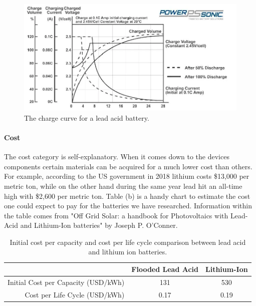 \begin{figure}
    \centering
    \includegraphics[scale=0.5]{figures/lead acid charge curve.png}
    \caption{The charge curve for a lead acid battery.}
    \label{fig:lead-acid-charge-curve} 
\end{figure}
\paragraph{Cost}
The cost category is self-explanatory. When it comes down to the devices components certain materials can be acquired for a much lower cost than others. For example, according to the US government in 2018 lithium costs \$13,000 per metric ton, while on the other hand during the same year lead hit an all-time high with \$2,600 per metric ton. Table (b) is a handy chart to estimate the cost one could expect to pay for the batteries we have researched. Information within the table comes from "Off Grid Solar: a handbook for Photovoltaics with Lead-Acid and Lithium-Ion batteries" by Joseph P. O'Conner.

\begin{table}
\centering\scriptsize
\caption{Initial cost per capacity and cost per life cycle comparison between lead acid and lithium ion batteries.}
\begin{tabular}{|r|c|c|}
\hline
& Flooded Lead Acid & Lithium-Ion \\ 
\hline
Initial Cost per Capacity (USD/kWh)    & 131   & 530  \\\hline
Cost per Life Cycle (USD/kWh)    & 0.17     & 0.19 \\\hline
\end{tabular}
\label{tab:battery-cost-comparison}
\end{table}

